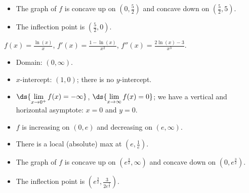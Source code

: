 \documentclass{ximera}
\begin{document}
\begin{question}
\begin{problem}
\begin{solution}
\begin{itemize}
\item  The graph of $f$ is concave up on $\left(0, \frac{5}{2}\right)$ and concave down on $\left( \frac{5}{2}, 5\right)$.

\item  The inflection point is $\left( \frac{5}{2}, 0\right)$.

\end{itemize}
\end{solution}
\end{problem}

\begin{problem}\label{logcurvesketchlast} 
$f(x) = \frac{\ln(x)}{x}$, $f'(x) = \frac{1 - \ln(x)}{x^2}$, $f''(x) = \frac{2 \ln(x) - 3}{x^3}$.

\begin{solution}
\begin{itemize}  \item  Domain:  $(0, \infty)$.

\item $x$-intercept:  $\left( 1 , 0\right)$;  there is no $y$-intercept.

\item $\ds{\lim_{x \rightarrow 0^{+}} f(x) = -\infty}$, $\ds{\lim_{x \rightarrow \infty} f(x) = 0}$;  we have a vertical and horizontal asymptote: $x = 0$ and  $y = 0$.

\item  $f$ is  increasing on  $(0, e)$ and decreasing on $(e, \infty)$.

\item  There is a local (absolute) max at $\left(e, \frac{1}{e}\right)$.

\item  The graph of $f$ is concave up on $\left(e^{\frac{3}{2}}, \infty \right)$ and concave down on $\left(0 ,  e^{\frac{3}{2}} \right)$.

\item  The inflection point is $\left( e^{\frac{3}{2}},  \frac{3}{2 e^{\frac{3}{2}}} \right)$.

\end{itemize}
\end{solution}
\end{problem}

\end{question}
\end{document}
